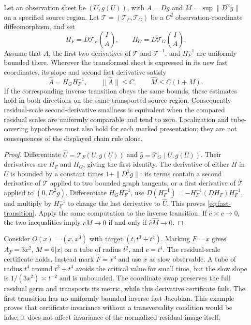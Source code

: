 \begin{proposition}\label{prop:fast-switch}
Let an observation sheet be $(U,g(U))$, with $A=Dg$ and $M=\sup\|D^2g\|$ on a specified source region. Let $\mathcal T=(\mathcal T_F,\mathcal T_G)$ be a $C^2$ observation-coordinate diffeomorphism, and set
\[
 H_F=D\mathcal T_F\binom{I}{A},\qquad
 H_G=D\mathcal T_G\binom{I}{A}.
\]
Assume that $A$, the first two derivatives of $\mathcal T$ and $\mathcal T^{-1}$, and $H_F^{-1}$ are uniformly bounded there. Wherever the transformed sheet is expressed in its new fast coordinates, its slope and second fast derivative satisfy
\begin{equation}\label{eq:fast-transition}
 \widehat A=H_GH_F^{-1},\qquad
 \|\widehat A\|\le C,\qquad \widehat M\le C(1+M).
\end{equation}
If the corresponding inverse transition obeys the same bounds, these estimates hold in both directions on the same transported source region. Consequently residual-scale second-derivative smallness is equivalent when the compared residual scales are uniformly comparable and tend to zero. Localization and tube-covering hypotheses must also hold for each marked presentation; they are not consequences of the displayed chain rule alone.
\end{proposition}
\begin{proof}
Differentiate $\widehat U=\mathcal T_F(U,g(U))$ and $\widehat g=\mathcal T_G(U,g(U))$. Their derivatives are $H_F$ and $H_G$, giving the first identity. The derivative of either $H$ in $U$ is bounded by a constant times $1+\|D^2g\|$: its terms contain a second derivative of $\mathcal T$ applied to two bounded graph tangents, or a first derivative of $\mathcal T$ applied to $(0,D^2g)$. Differentiate $H_GH_F^{-1}$, use
$D(H_F^{-1})=-H_F^{-1}(DH_F)H_F^{-1}$, and multiply by $H_F^{-1}$ to change the last derivative to $\widehat U$. This proves \eqref{eq:fast-transition}. Apply the same computation to the inverse transition. If $\widehat c\asymp c\to0$, the two inequalities imply $cM\to0$ if and only if $\widehat c\widehat M\to0$.
\end{proof}

\begin{example}\label{ex:marked-certificate}
Consider $O(x)=(x,x^3)$ with target $(t,t^3+t^4)$. Marking $F=x$ gives $A_F=3x^2$, $M=6|x|$ on a tube of radius $t^2$, and $c=t^4$. The residual-scale certificate holds. Instead mark $\widehat F=x^3$ and use $x$ as slow observable. A tube of radius $t^4$ around $t^3+t^4$ avoids the critical value for small time, but the slow slope is $1/(3x^2)\asymp t^{-2}$ and is unbounded. The coordinate swap preserves the full residual germ and transports its metric, while this derivative certificate fails. The first transition has no uniformly bounded inverse fast Jacobian. This example proves that certificate invariance without a transversality condition would be false; it does not affect invariance of the normalized residual image itself.
\end{example}

